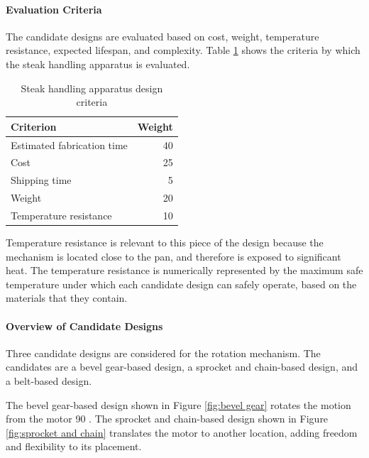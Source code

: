 \documentclass[11pt]{article}
\newcommand{\subsubsubsection}[1]{\paragraph{#1}\mbox{}}
\begin{document}
\subsubsubsection{Evaluation Criteria}

\noindent
The candidate designs are evaluated based on cost, weight, temperature resistance, expected lifespan, and complexity.
Table \ref{table:steak handling apparatus criteria} shows the criteria by which the steak handling apparatus is evaluated.

\begin{table}[H]
\begin{tabularx}{\textwidth}{X  r}

\hline

Criterion & Weight \\

\hline

Estimated fabrication time & 40 \\
Cost & 25 \\
Shipping time & 5 \\
Weight & 20 \\
Temperature resistance & 10 \\

\hline

\end{tabularx}
\caption{Steak handling apparatus design criteria}
\label{table:steak handling apparatus criteria}
\end{table}

Temperature resistance is relevant to this piece of the design because the mechanism is located close to the pan, and therefore is exposed to significant heat.
The temperature resistance is numerically represented by the maximum safe temperature under which each candidate design can safely operate, based on the materials that they contain.

\subsubsubsection{Overview of Candidate Designs}

Three candidate designs are considered for the rotation mechanism.
The candidates are a bevel gear-based design, a sprocket and chain-based design, and a belt-based design.

The bevel gear-based design shown in Figure \ref{fig:bevel gear} rotates the motion from the motor 90 \degree.
The sprocket and chain-based design shown in Figure \ref{fig:sprocket and chain} translates the motor to another location, adding freedom and flexibility to its placement.
\end{document}
